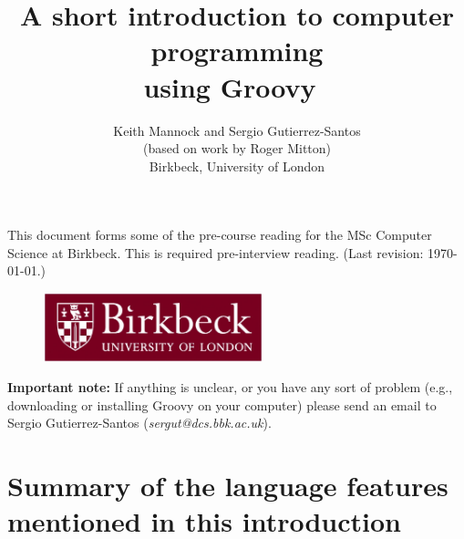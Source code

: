 \documentclass[11pt,a4paper]{article}
\title{A short introduction to computer programming\\
  using Groovy~}
\author{Keith Mannock and Sergio Gutierrez-Santos\\(based on work by
  Roger Mitton)\\
Birkbeck, University of London}
\date{}
\begin{document}
\maketitle
\thispagestyle{empty}


\noindent This document forms some of the pre-course reading for the
MSc Computer Science at Birkbeck. This is required pre-interview
reading. 
(Last revision: \today.)

\vfill 

\begin{figure}[h!]
  \centering
  \includegraphics[height=2cm]{bbk.eps}
\end{figure}

\vfill 


\newpage
\textbf{Important note: }If anything is unclear, or you have any 
sort of problem (e.g.,
downloading or installing Groovy on your computer) please send an
email to Sergio Gutierrez-Santos (\emph{sergut@dcs.bbk.ac.uk}).
\newpage

\newpage

\newpage

\newpage

\newpage

\newpage
\section{Summary of the language features mentioned in this introduction}

\newpage

\end{document}
